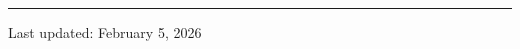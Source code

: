 \documentclass[11pt,a4paper]{article}
\begin{document}

\vfill




\vfill
\noindent\rule{\textwidth}{0.4pt}
\small{Last updated: February 5, 2026}
\end{document}
